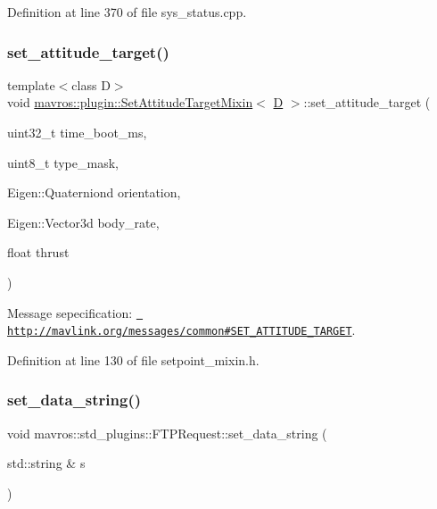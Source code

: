 Definition at line 370 of file sys\+\_\+status.\+cpp.

\mbox{\label{group__plugin_gac84714c4a377cd9eeef8ead08b0e8bc5}} 
\subsubsection{\texorpdfstring{set\_attitude\_target()}{set\_attitude\_target()}}
{\footnotesize\ttfamily template$<$class D$>$ \\
void \mbox{\hyperlink{classmavros_1_1plugin_1_1SetAttitudeTargetMixin}{mavros\+::plugin\+::\+Set\+Attitude\+Target\+Mixin}}$<$ \mbox{\hyperlink{mavlink__sha256_8h_af316c33cc298530f245e8b55330e86b5}{D}} $>$\+::set\+\_\+attitude\+\_\+target (\begin{DoxyParamCaption}\item[{uint32\+\_\+t}]{time\+\_\+boot\+\_\+ms,  }\item[{uint8\+\_\+t}]{type\+\_\+mask,  }\item[{Eigen\+::\+Quaterniond}]{orientation,  }\item[{Eigen\+::\+Vector3d}]{body\+\_\+rate,  }\item[{float}]{thrust }\end{DoxyParamCaption})\hspace{0.3cm}{\ttfamily [inline]}}



Message sepecification\+: {\ttfamily \href{http://mavlink.org/messages/common\#SET_ATTITUDE_TARGET}{\texttt{ http\+://mavlink.\+org/messages/common\#\+S\+E\+T\+\_\+\+A\+T\+T\+I\+T\+U\+D\+E\+\_\+\+T\+A\+R\+G\+ET}}}. 



Definition at line 130 of file setpoint\+\_\+mixin.\+h.

\mbox{\label{group__plugin_ga79bbc1bfe041055051a72f5c1efb630d}} 
\subsubsection{\texorpdfstring{set\_data\_string()}{set\_data\_string()}}
{\footnotesize\ttfamily void mavros\+::std\+\_\+plugins\+::\+F\+T\+P\+Request\+::set\+\_\+data\+\_\+string (\begin{DoxyParamCaption}\item[{std\+::string \&}]{s }\end{DoxyParamCaption})\hspace{0.3cm}{\ttfamily [inline]}}



